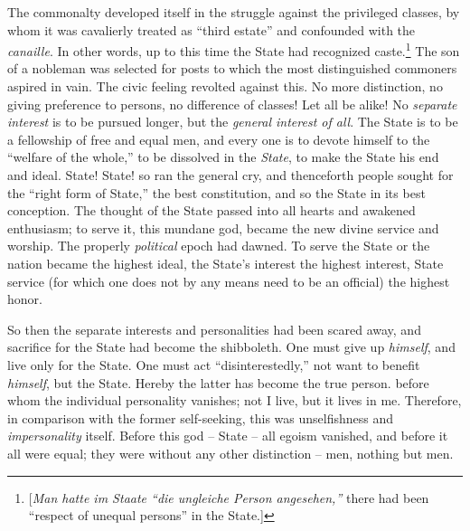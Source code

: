 The commonalty developed itself in the struggle against the privileged 
classes, by whom it was cavalierly treated as ``third estate'' and 
confounded with the \textit{canaille}. In other words, up to this time the 
State had recognized caste.\footnote{[\textit{Man hatte im Staate ``die 
ungleiche Person angesehen,''} there had been ``respect of unequal 
persons'' in the State.]} The son of a nobleman was selected for posts to 
which the most distinguished commoners aspired in vain. The civic feeling 
revolted against this. No more distinction, no giving preference to persons, 
no difference of classes! Let all be alike! No \textit{separate interest} is 
to be pursued longer, but the \textit{general interest of all}. The State is 
to be a fellowship of free and equal men, and every one is to devote himself 
to the ``welfare of the whole,'' to be dissolved in the \textit{State}, to 
make the State his end and ideal. State! State! so ran the general cry, and 
thenceforth people sought for the ``right form of State,'' the best 
constitution, and so the State in its best conception. The thought of the 
State passed into all hearts and awakened enthusiasm; to serve it, this 
mundane god, became the new divine service and worship. The properly 
\textit{political} epoch had dawned. To serve the State or the nation became 
the highest ideal, the State's interest the highest interest, State service 
(for which one does not by any means need to be an official) the highest 
honor.

So then the separate interests and personalities had been scared away, and 
sacrifice for the State had become the shibboleth. One must give up 
\textit{himself}, and live only for the State. One must act 
``disinterestedly,'' not want to benefit \textit{himself}, but the State. 
Hereby the latter has become the true person. before whom the individual 
personality vanishes; not I live, but it lives in me. Therefore, in comparison 
with the former self-seeking, this was unselfishness and 
\textit{impersonality} itself. Before this god -- State -- all egoism 
vanished, and before it all were equal; they were without any other 
distinction -- men, nothing but men.


